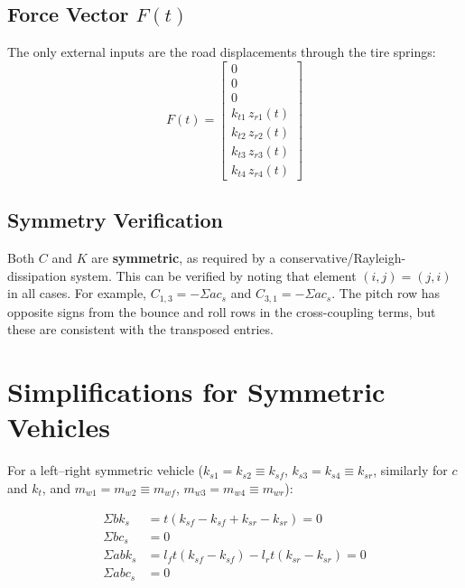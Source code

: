\documentclass[11pt]{article}
\def\vect#1{#1}%
\newcommand{\vect}[1]{\bm{#1}}
\begin{document}
\subsection{Force Vector $\vect{F}(t)$}

The only external inputs are the road displacements through the tire springs:
\begin{equation}
\boxed{
\vect{F}(t) = \begin{bmatrix} 0 \\ 0 \\ 0 \\ k_{t1}\,z_{r1}(t) \\ k_{t2}\,z_{r2}(t) \\ k_{t3}\,z_{r3}(t) \\ k_{t4}\,z_{r4}(t) \end{bmatrix}
}
\label{eq:F}
\end{equation}

\subsection{Symmetry Verification}

Both $\vect{C}$ and $\vect{K}$ are \textbf{symmetric}, as required by a conservative/Rayleigh-dissipation system. This can be verified by noting that element $(i,j) = (j,i)$ in all cases. For example, $C_{1,3} = -\Sigma a c_s$ and $C_{3,1} = -\Sigma a c_s$. The pitch row has opposite signs from the bounce and roll rows in the cross-coupling terms, but these are consistent with the transposed entries.

\section{Simplifications for Symmetric Vehicles}

For a left--right symmetric vehicle ($k_{s1}=k_{s2}\equiv k_{sf}$, $k_{s3}=k_{s4}\equiv k_{sr}$, similarly for $c$ and $k_t$, and $m_{w1}=m_{w2}\equiv m_{wf}$, $m_{w3}=m_{w4}\equiv m_{wr}$):

\begin{equation}
\begin{aligned}
\Sigma b k_s &= t(k_{sf} - k_{sf} + k_{sr} - k_{sr}) = 0 \\
\Sigma b c_s &= 0 \\
\Sigma ab k_s &= l_f t(k_{sf} - k_{sf}) - l_r t(k_{sr} - k_{sr}) = 0 \\
\Sigma ab c_s &= 0
\end{aligned}
\end{equation}
\end{document}
